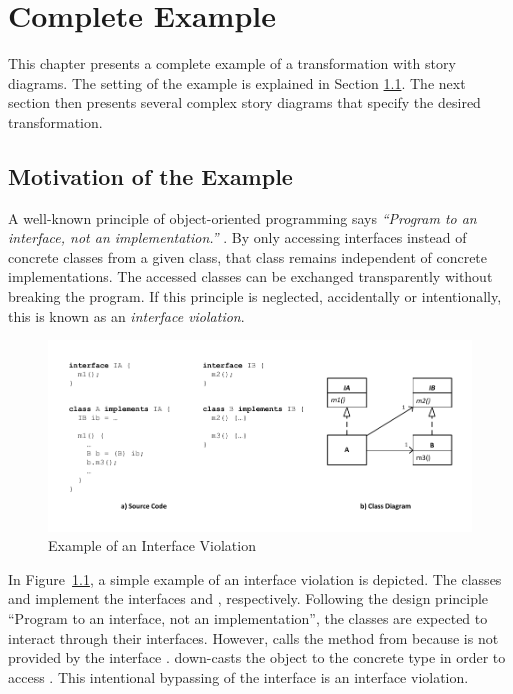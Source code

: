 \chapter{Complete Example} \label{sec:Example}


This chapter presents a complete example of a transformation with story diagrams. The setting of the example is explained in Section \ref{sec:Example:Motivation}. The next section then presents several complex story diagrams that specify the desired transformation.

\section{Motivation of the Example}
\label{sec:Example:Motivation}

A well-known principle of object-oriented programming says \emph{``Program to an interface, not an implementation.''} \cite{GHJV95}. By only accessing interfaces instead of concrete classes from a given class, that class remains independent of concrete implementations. The accessed classes can be exchanged transparently without breaking the program. If this principle is neglected, accidentally or intentionally, this is known as an \emph{interface violation}.

\begin{figure}[hbtp]
\centering
\includegraphics[width=\linewidth]{./figures/InterfaceViolation}
\caption{Example of an Interface Violation}
\label{fig:InterfaceViolationExample}
\end{figure}

In Figure~\ref{fig:InterfaceViolationExample}, a simple example of an interface violation is depicted. The classes  and  implement the interfaces  and , respectively. Following the design principle ``Program to an interface, not an implementation'', the classes are expected to interact through their interfaces. However,  calls the method  from  because  is not provided by the interface .  down-casts the object  to the concrete type  in order to access . This intentional bypassing of the interface  is an interface violation.

